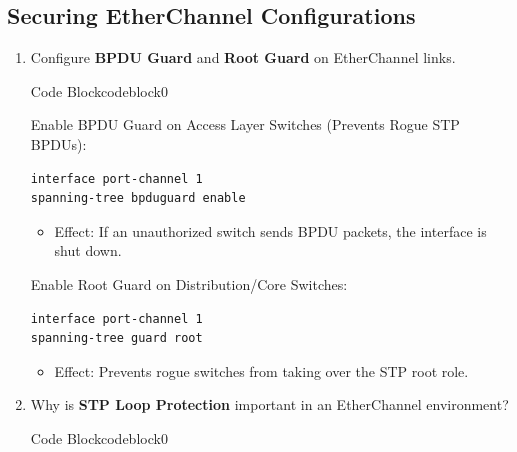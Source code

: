 \documentclass[a4paper]{article}
\begin{document}
\subsection{Securing EtherChannel Configurations}
\begin{enumerate}
	\item Configure \textbf{BPDU Guard} and \textbf{Root Guard} on EtherChannel links.


	      \begin{ocg}{Code Block}{codeblock}{0}

		      \vspace{0.5cm}

		      Enable BPDU Guard on Access Layer Switches (Prevents Rogue STP BPDUs):
		      \begin{lstlisting}
interface port-channel 1
spanning-tree bpduguard enable
    \end{lstlisting}
		      \begin{itemize}
			      \item \small Effect: If an unauthorized switch sends BPDU packets, the interface is shut down.
		      \end{itemize}
		      \vspace{1cm}
		      Enable Root Guard on Distribution/Core Switches:
		      \begin{lstlisting}
interface port-channel 1
spanning-tree guard root
            \end{lstlisting}

		      \begin{itemize}
			      \item \small Effect: Prevents rogue switches from taking over the STP root role.
		      \end{itemize}
		      \vspace{0.5cm}
	      \end{ocg}
	\item Why is \textbf{STP Loop Protection} important in an EtherChannel environment?


	      \begin{ocg}{Code Block}{codeblock}{0}


\end{ocg}
\end{enumerate}
\end{document}

